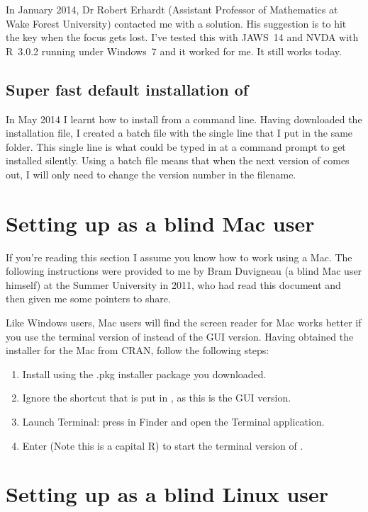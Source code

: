 In January 2014, Dr Robert Erhardt (Assistant Professor of Mathematics at Wake Forest University) contacted me with a solution. His suggestion is to hit the  key when the focus gets lost. I've tested this with  JAWS~14 and NVDA with  R~3.0.2 running under Windows~7 and it worked for me. It still works today. 

\subsection{Super fast default installation of \R{}}

In May 2014 I learnt how to install \R{} from a command line. Having downloaded the installation file, I created a batch file with the single line  that I put in the same folder. This single line is what could be typed in at a command prompt to get \R{} installed silently. Using a batch file means that when the next version of \R{} comes out, I will only need to change the version number in the filename.



\section{Setting up \R{} as a blind Mac user}

If you're reading this section I assume you know how to work using a Mac. The following instructions were provided to me by Bram Duvigneau %
 (a blind Mac user himself) at the Summer University in 2011, who had read this document and then given me some pointers to share. 

Like Windows users, Mac users will find the screen reader for Mac works better if you use the terminal version of \R{} instead of the GUI version. Having obtained the installer for the Mac from CRAN, follow the following steps: \begin{enumerate}
\item Install \R{} using the .pkg installer package you downloaded. 
\item Ignore the shortcut that is put in , as this is the GUI version.
\item Launch Terminal: press  in Finder and open the Terminal application.
\item Enter  (Note this is a capital R) to start the terminal version of \R{}.
\end{enumerate}

\section{Setting up \R{} as a blind Linux user}

